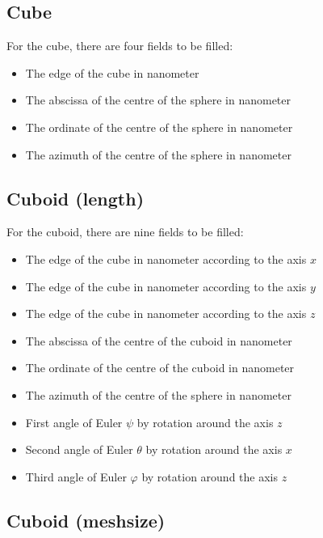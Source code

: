 \subsection{Cube}

For the cube, there are four fields to be filled:

\begin{itemize}
\item The edge of the cube in nanometer
\item The abscissa of the centre of the sphere in nanometer
\item The ordinate of the centre of the sphere in nanometer
\item The azimuth of the centre of the sphere in nanometer
\end{itemize}

\subsection{Cuboid (length)}

For the cuboid, there are nine fields to be filled:

\begin{itemize}
\item The edge of the cube in nanometer according to the axis $x$
\item The edge of the cube in nanometer according to the axis $y$
\item The edge of the cube in nanometer according to the axis $z$
\item The abscissa of the centre of the cuboid in nanometer
\item The ordinate of the centre of the cuboid in nanometer
\item The azimuth of the centre of the sphere in nanometer
\item First angle of Euler $\psi$ by rotation around the axis $z$
\item Second angle of Euler $\theta$ by rotation around the axis $x$
\item Third angle of Euler $\varphi$ by rotation around the axis $z$
\end{itemize}

\subsection{Cuboid (meshsize)}

